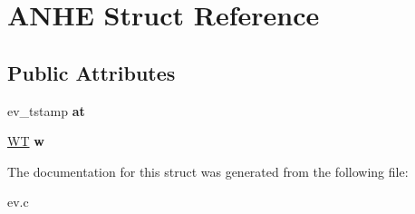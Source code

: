 \hypertarget{struct_a_n_h_e}{}\section{A\+N\+HE Struct Reference}
\label{struct_a_n_h_e}
\subsection*{Public Attributes}
\begin{DoxyCompactItemize}
\item 
\hypertarget{struct_a_n_h_e_ac709e86b847f2ff2c666b76a108be313}{}\label{struct_a_n_h_e_ac709e86b847f2ff2c666b76a108be313} 
ev\+\_\+tstamp {\bfseries at}
\item 
\hypertarget{struct_a_n_h_e_a09752e837045eaebbce3f1a1e2f4274f}{}\label{struct_a_n_h_e_a09752e837045eaebbce3f1a1e2f4274f} 
\hyperlink{structev__watcher__time}{WT} {\bfseries w}
\end{DoxyCompactItemize}


The documentation for this struct was generated from the following file\+:\begin{DoxyCompactItemize}
\item 
ev.\+c\end{DoxyCompactItemize}
